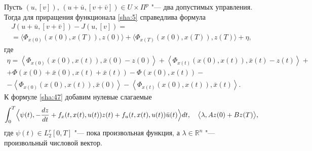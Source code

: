 \begin{mproof} Пусть $(u,[v])$, $(u+\bar{u},[v+\bar{v}])\in U\times \Pi ^{p}$ "--- два допустимых управления. 
Тогда для приращения функционала \eqref{sha:5} справедлива формула
\begin{multline} \label{sha:47} 
J(u+\bar{u},[v+\bar{v}])-J(u,[v])= 
\\
=\langle\Phi_{x(0)}(x(0),x(T)),z(0)\rangle+\langle\Phi_{x(T)}(x(0),x(T)),z(T)\rangle +\eta ,
\end{multline} 
где
\begin{multline} \label{sha:48} 
\eta =\left\langle \Phi _{x\left(0\right)} \left(x\left(0\right),x( t )\right),\bar{x}\left(0\right)-z\left(0\right)\right\rangle +\left\langle \Phi _{x( t )} \left(x\left(0\right),x( t )\right),\bar{x}( t )-z( t )\right\rangle + 
\\
+\Phi \left(x\left(0\right)+\bar{x}\left(0\right),x( t )+\bar{x}( t )\right)-\Phi \left(x\left(0\right),x( t )\right)- 
\\
-\left\langle \Phi _{x\left(0\right)} \left(x\left(0\right),x( t )\right),\bar{x}\left(0\right)\right\rangle -\left\langle \Phi _{x( t )} \left(x\left(0\right),x( t )\right),\bar{x}( t )\right\rangle .
\end{multline} 
К формуле \eqref{sha:47} добавим нулевые слагаемые
\begin{equation} \label{sha:49} 
\int_{0}^{T}\Bigl\langle \psi(t),-\frac{dz}{dt}+f_{x}(t,x(t),u(t))z(t)+f_u(t,x(t),u(t))\bar{u}(t)\Bigr\rangle  dt, \quad 
\bigl\langle \lambda ,Az(0)+Bz(T)\bigr\rangle,
\end{equation} 
где $\psi(t)\in L_{2}^{r}[0, T]$ "--- пока произвольная функция, а $\lambda \in \mathbb R^{n} $ "--- произвольный числовой вектор.


\end{mproof}
